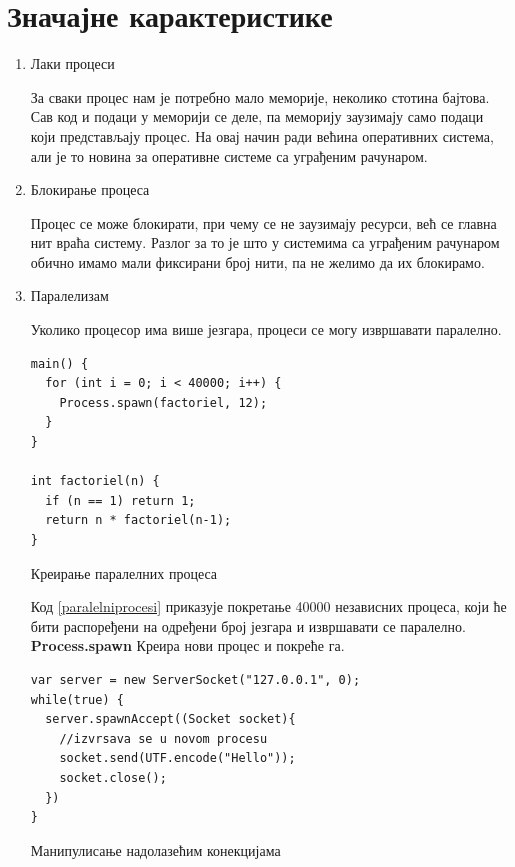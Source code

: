 \documentclass[12pt,oneside]{memoir}
\begin{document}
\section{Значајне карактеристике}
\begin{enumerate} 
\item Лаки процеси

За сваки процес нам је потребно мало меморије, неколико стотина бајтова. Сав код и подаци у меморији се деле, па меморију заузимају само подаци који представљају процес. На овај начин ради већина оперативних система, али је то новина за оперативне системе са уграђеним рачунаром.

\item Блокирање процеса

Процес се може блокирати, при чему се не заузимају ресурси, већ се главна нит враћа систему. Разлог за то је што у системима са уграђеним рачунаром обично имамо мали фиксирани број нити, па не желимо да их блокирамо. 

\item Паралелизам

Уколико процесор има више језгара, процеси се могу извршавати паралелно.

\begin{listing}
\centering
\begin{verbatim}
main() {
  for (int i = 0; i < 40000; i++) {
    Process.spawn(factoriel, 12);
  }
}

int factoriel(n) {
  if (n == 1) return 1;
  return n * factoriel(n-1);
}
\end{verbatim}
\caption{Креирање паралелних процеса}
\label{paralelniprocesi}
\end{listing}

Код \ref{paralelniprocesi} приказује покретање 40000 независних процеса, који ће бити распоређени на одређени број језгара и извршавати се паралелно. \textbf{Process.spawn} Креира нови процес и покреће га.

\begin{listing}
\begin{verbatim}
var server = new ServerSocket("127.0.0.1", 0);
while(true) {
  server.spawnAccept((Socket socket){
	//izvrsava se u novom procesu
	socket.send(UTF.encode("Hello"));
	socket.close();
  })
}
\end{verbatim}
\caption{Манипулисање надолазећим конекцијама}
\label{konekcije}
\end{listing}


\end{enumerate}
\end{document}
